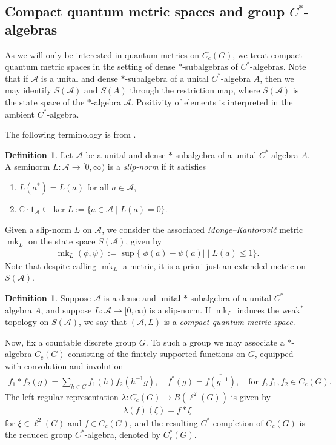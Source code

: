 \documentclass[12pt,a4paper,oneside,final,reqno]{amsart}
\newcommand{\C}{\mathbb{C}}
\theoremstyle{plain}
\theoremstyle{definition}
\newtheorem{definition}[theorem]{Definition}
\begin{document}
\subsection{Compact quantum metric spaces and group $C^*$-algebras}\label{subsec:prelims-CQMS}
% 
As we will only be interested in quantum metrics on $C_c(G)$, we treat compact quantum metric spaces in the setting of dense $*$-subalgebras of $C^*$-algebras. 
Note that if $\mathcal{A}$ is a unital and dense $*$-subalgebra of a unital $C^*$-algebra $A$, then we may identify $S(\mathcal{A})$ and $S(A)$ through the restriction map, where $S(\mathcal{A})$ is the state space of the $*$-algebra $\mathcal{A}$. Positivity of elements is interpreted in the ambient $C^*$-algebra. 

The following terminology is from \cite{RieffelMartricialBridges2016}.
\begin{definition}
    Let $\mathcal{A}$ be a unital and dense $*$-subalgebra of a unital $C^*$-algebra $A$. A seminorm $L \colon \mathcal{A} \to [0,\infty)$ is a \emph{slip-norm} if it satisfies
    \begin{enumerate}
        \item $L(a^*) = L(a)$ for all $a \in \mathcal{A}$,
        \item $\C \cdot 1_{\mathcal{A}} \subseteq \ker L := \{a \in \mathcal{A} \mid L(a) = 0 \}$. 
    \end{enumerate}
\end{definition}
Given a slip-norm $L$ on $\mathcal{A}$, we consider the associated \emph{Monge--Kantorovi\v{c}} metric $\operatorname{mk}_L$ on the state space $S(\mathcal{A})$, given by
\begin{align*}
    \operatorname{mk}_L (\phi, \psi ) := \sup \{ \vert \phi(a) - \psi(a) \vert \mid L(a) \leq 1 \}.
\end{align*}
Note that despite calling $\operatorname{mk}_L$ a metric, it is a priori just an extended metric on $S(\mathcal{A})$. 

\begin{definition}\label{def:CQMS}
    Suppose $\mathcal{A}$ is a dense and unital $*$-subalgebra of a unital $C^*$-algebra $A$, and suppose $L \colon \mathcal{A} \to [0, \infty)$ is a slip-norm. If $\operatorname{mk}_L$ induces the weak$^*$ topology on $S(\mathcal{A})$, we say that $(\mathcal{A}, L)$ is a \emph{compact quantum metric space}. 
\end{definition}

Now, fix a countable discrete group $G$. To such a group we may associate a $*$-algebra $C_c(G)$ consisting of the finitely supported functions on $G$, equipped with convolution and involution
\begin{align*}
    f_1*f_2 (g) = \sum_{h\in G} f_1(h) f_2 (h^{-1}g), \quad f^*(g) = \overline{f(g^{-1})}, \quad 
    \text{for $f, f_1, f_2 \in C_c(G)$}. 
\end{align*}
The left regular representation $\lambda \colon C_c(G) \to B(\ell^2(G))$ is given by
\begin{align*}
    \lambda(f)(\xi) = f * \xi 
\end{align*}
for $\xi \in \ell^2(G)$ and $f \in C_c (G)$, and the resulting $C^*$-completion of $C_c(G)$ is the reduced group $C^*$-algebra, denoted by $C^*_r(G)$. 
\end{document}

